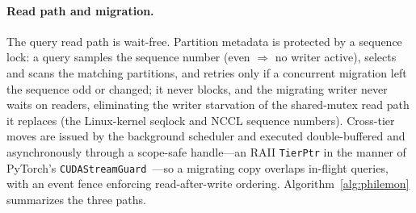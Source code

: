 \documentclass[10pt]{article}
\theoremstyle{definition}
\begin{document}
\paragraph{Read path and migration.}
The query read path is wait-free. Partition metadata is protected by a sequence
lock: a query samples the sequence number (even $\Rightarrow$ no writer active),
selects and scans the matching partitions, and retries only if a concurrent
migration left the sequence odd or changed; it never blocks, and the migrating
writer never waits on readers, eliminating the writer starvation of the
shared-mutex read path it replaces (the Linux-kernel seqlock and NCCL sequence
numbers). Cross-tier moves are issued by the background scheduler and executed
double-buffered and asynchronously through a scope-safe handle---an RAII
\texttt{TierPtr} in the manner of PyTorch's \texttt{CUDAStreamGuard}~\citep{paszke2019pytorch}---so
a migrating copy overlaps in-flight queries, with an event fence enforcing
read-after-write ordering. Algorithm~\ref{alg:philemon} summarizes the three
paths.
\end{document}
